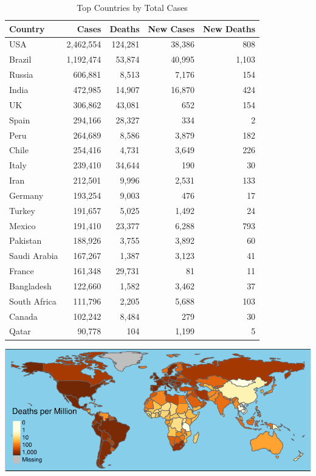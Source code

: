 \documentclass[]{article}
\begin{document}
\newpage

\begin{table}[!h]

\caption{\label{tab:unnamed-chunk-3}Top Countries by Total Cases}
\centering
\begin{tabular}{l|r|r|r|r}
\hline
Country & Cases & Deaths & New Cases & New Deaths\\
\hline
USA & 2,462,554 & 124,281 & 38,386 & 808\\
\hline
Brazil & 1,192,474 & 53,874 & 40,995 & 1,103\\
\hline
Russia & 606,881 & 8,513 & 7,176 & 154\\
\hline
India & 472,985 & 14,907 & 16,870 & 424\\
\hline
UK & 306,862 & 43,081 & 652 & 154\\
\hline
Spain & 294,166 & 28,327 & 334 & 2\\
\hline
Peru & 264,689 & 8,586 & 3,879 & 182\\
\hline
Chile & 254,416 & 4,731 & 3,649 & 226\\
\hline
Italy & 239,410 & 34,644 & 190 & 30\\
\hline
Iran & 212,501 & 9,996 & 2,531 & 133\\
\hline
Germany & 193,254 & 9,003 & 476 & 17\\
\hline
Turkey & 191,657 & 5,025 & 1,492 & 24\\
\hline
Mexico & 191,410 & 23,377 & 6,288 & 793\\
\hline
Pakistan & 188,926 & 3,755 & 3,892 & 60\\
\hline
Saudi Arabia & 167,267 & 1,387 & 3,123 & 41\\
\hline
France & 161,348 & 29,731 & 81 & 11\\
\hline
Bangladesh & 122,660 & 1,582 & 3,462 & 37\\
\hline
South Africa & 111,796 & 2,205 & 5,688 & 103\\
\hline
Canada & 102,242 & 8,484 & 279 & 30\\
\hline
Qatar & 90,778 & 104 & 1,199 & 5\\
\hline
\end{tabular}
\end{table}

\newpage

\includegraphics{covid_files/figure-latex/unnamed-chunk-4-1.pdf}
\end{document}
